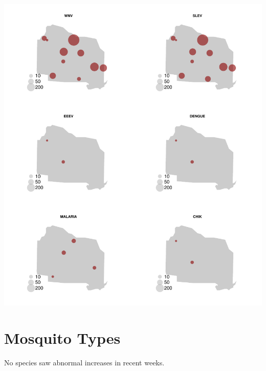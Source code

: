 \documentclass{article}
\begin{document}
\includegraphics{mosquitoReport-007}


\section*{Mosquito Types}
\hrulefill
\vspace{5mm}

No species saw abnormal increases in recent weeks.  
\end{document}
